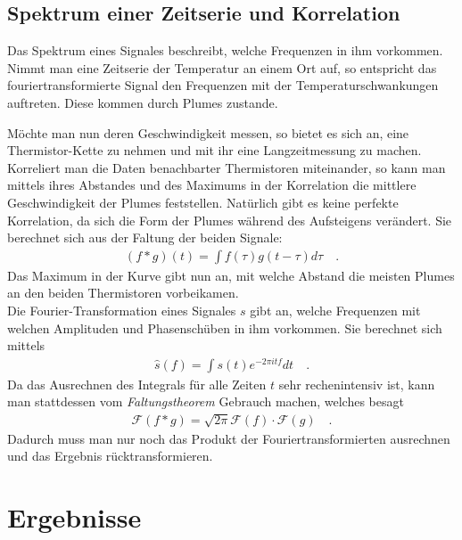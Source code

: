 \documentclass[12pt,a4paper,titlepage,headinclude]{scrartcl}
\numberwithin{equation}{subsection}
\begin{document}
\subsection{Spektrum einer Zeitserie und Korrelation}
Das Spektrum eines Signales beschreibt, welche Frequenzen in ihm vorkommen.
Nimmt man eine Zeitserie der Temperatur an einem Ort auf, so entspricht das fouriertransformierte Signal den Frequenzen mit der Temperaturschwankungen auftreten.
Diese kommen durch Plumes zustande.

Möchte man nun deren Geschwindigkeit messen, so bietet es sich an, eine Thermistor-Kette zu nehmen und mit ihr eine Langzeitmessung zu machen.
Korreliert man die Daten benachbarter Thermistoren miteinander, so kann man mittels ihres Abstandes und des Maximums in der Korrelation die mittlere Geschwindigkeit der Plumes feststellen.
Natürlich gibt es keine perfekte Korrelation, da sich die Form der Plumes während des Aufsteigens verändert.
Sie berechnet sich aus der Faltung der beiden Signale:
\begin{align}
	(f*g)(t)=\int f(\tau)g(t-\tau) d\tau\quad.
	\label{eq:faltung}
\end{align}
Das Maximum in der Kurve gibt nun an, mit welche Abstand die meisten Plumes an den beiden Thermistoren vorbeikamen.\\

Die Fourier-Transformation eines Signales $s$ gibt an, welche Frequenzen mit welchen Amplituden und Phasenschüben in ihm vorkommen.
Sie berechnet sich mittels
\begin{align*}
	\hat s(f)=\int s(t) e^{-2\pi i t f}dt\quad.
\end{align*}
Da das Ausrechnen des Integrals für alle Zeiten $t$ sehr rechenintensiv ist, kann man stattdessen vom \textit{Faltungstheorem} Gebrauch machen, welches besagt
\begin{align*}
	\mathcal F(f*g)=\sqrt{2\pi}\mathcal F(f)\cdot\mathcal F(g)\quad.
\end{align*}
Dadurch muss man nur noch das Produkt der Fouriertransformierten ausrechnen und das Ergebnis rücktransformieren.


\newpage
\section{Ergebnisse}
\label{sec:auswertung}
\end{document}
